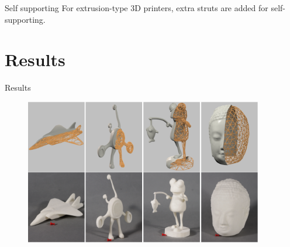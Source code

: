 \documentclass{beamer}
\begin{document}
\begin{frame}{Self supporting}
For extrusion-type 3D printers, extra struts are added for self-supporting.
\end{frame}

\section{Results}
\begin{frame}{Results}
\begin{figure}
\centering
\includegraphics[height=2.5in]{./img/result1.png}
\end{figure}
\end{frame}
\end{document}
